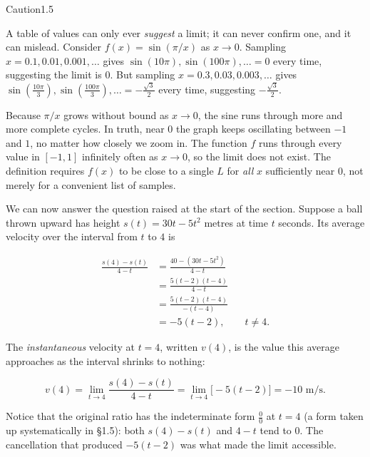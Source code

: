 \documentclass[a4paper,12pt,oneside]{memoir}
\begin{document}
\begin{envcaution}{Caution}{1.5}{}
\begin{raggedpara}
A table of values can only ever \emph{suggest} a limit; it can never confirm one, and it can mislead. Consider \(f(x) = \sin(\pi / x)\) as \(x \to 0\). Sampling \(x = 0.1, 0.01, 0.001, \dots\) gives \(\sin(10\pi), \sin(100\pi), \dots = 0\) every time, suggesting the limit is \(0\). But sampling \(x = 0.3, 0.03, 0.003, \dots\) gives \(\sin\!\left(\tfrac{10\pi}{3}\right), \sin\!\left(\tfrac{100\pi}{3}\right), \dots = -\tfrac{\sqrt{3}}{2}\) every time, suggesting \(-\tfrac{\sqrt{3}}{2}\).
\end{raggedpara}
\begin{raggedpara}
Because \(\pi / x\) grows without bound as \(x \to 0\), the sine runs through more and more complete cycles. In truth, near \(0\) the graph keeps oscillating between \(-1\) and \(1\), no matter how closely we zoom in. The function \(f\) runs through every value in \([-1, 1]\) infinitely often as \(x \to 0\), so the limit does not exist. The definition requires \(f(x)\) to be close to a single \(L\) for \emph{all} \(x\) sufficiently near \(0\), not merely for a convenient list of samples.
\end{raggedpara}
\end{envcaution}
We can now answer the question raised at the start of the section. Suppose a ball thrown upward has height \(s(t) = 30t - 5t^{2}\) metres at time \(t\) seconds. Its average velocity over the interval from \(t\) to \(4\) is

\[ \begin{aligned}
    \frac{s(4) - s(t)}{4 - t}
      &= \frac{40 - (30t - 5t^{2})}{4 - t} \\[2pt]
      &= \frac{5(t - 2)(t - 4)}{4 - t} \\[2pt]
      &= \frac{5(t - 2)(t - 4)}{-(t - 4)} \\[2pt]
      &= -5(t - 2), \qquad t \neq 4.
  \end{aligned} \]

The \emph{instantaneous} velocity at \(t = 4\), written \(v(4)\), is the value this average approaches as the interval shrinks to nothing:

\[ v(4) = \lim_{t \to 4} \frac{s(4) - s(t)}{4 - t} = \lim_{t \to 4} \bigl[-5(t - 2)\bigr] = -10 \text{ m/s}. \]

Notice that the original ratio has the indeterminate form \(\tfrac{0}{0}\) at \(t = 4\) (a form taken up systematically in §1.5): both \(s(4) - s(t)\) and \(4 - t\) tend to \(0\). The cancellation that produced \(-5(t - 2)\) was what made the limit accessible.
\end{document}
